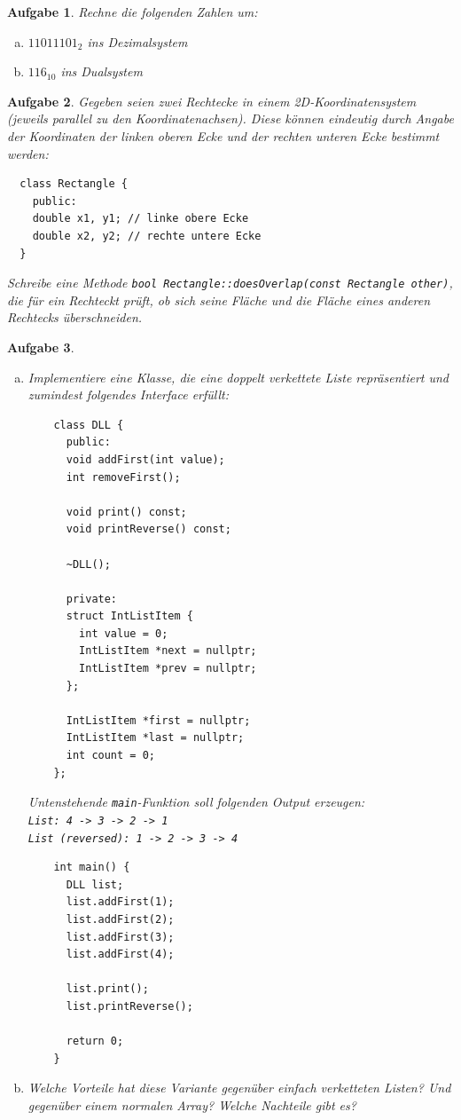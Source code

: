 \documentclass[a4paper,12pt,parskip=full]{scrartcl}
\theoremstyle{exercise}
\newtheorem{exercise}{Aufgabe}
\begin{document}
\begin{exercise}
Rechne die folgenden Zahlen um:
\begin{enumerate}[a)]
\item $11011101_2$ ins Dezimalsystem
\item $116_{10}$ ins Dualsystem
\end{enumerate}
\end{exercise}

\begin{exercise}
Gegeben seien zwei Rechtecke in einem 2D-Koordinatensystem
(jeweils parallel zu den Koordinatenachsen). Diese können eindeutig
durch Angabe der Koordinaten der linken oberen Ecke und der rechten
unteren Ecke bestimmt werden:
\begin{lstlisting}
  class Rectangle {
    public:
    double x1, y1; // linke obere Ecke
    double x2, y2; // rechte untere Ecke
  }
\end{lstlisting}
Schreibe eine Methode \lstinline{bool Rectangle::doesOverlap(const Rectangle other)}, die für ein Rechteckt prüft, ob sich seine Fläche
und die Fläche eines anderen Rechtecks überschneiden.
\end{exercise}

\begin{exercise}
\begin{enumerate}[a)]
\item Implementiere eine Klasse, die eine doppelt verkettete Liste
  repräsentiert und zumindest folgendes Interface erfüllt:
  \begin{lstlisting}
    class DLL {
      public:
      void addFirst(int value);
      int removeFirst();

      void print() const;
      void printReverse() const;

      ~DLL();
  
      private:
      struct IntListItem {
        int value = 0;
        IntListItem *next = nullptr;
        IntListItem *prev = nullptr;
      };

      IntListItem *first = nullptr;
      IntListItem *last = nullptr;
      int count = 0;
    };
  \end{lstlisting}
  Untenstehende \lstinline{main}-Funktion soll folgenden Output erzeugen: \\
  \texttt{List: 4 -> 3 -> 2 -> 1 \\
    List (reversed): 1 -> 2 -> 3 -> 4 }
  \begin{lstlisting}
    int main() {
      DLL list;
      list.addFirst(1);
      list.addFirst(2);
      list.addFirst(3);
      list.addFirst(4);

      list.print();
      list.printReverse();
  
      return 0; 
    }
  \end{lstlisting}
\item Welche Vorteile hat diese Variante gegenüber einfach verketteten
  Listen? Und gegenüber einem normalen Array? Welche Nachteile gibt
  es?
\end{enumerate}
\end{exercise}
\end{document}
